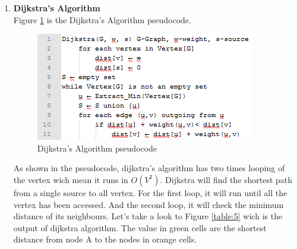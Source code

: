 \begin{enumerate}
	\item \textbf{Dijkstra's Algorithm}\\
	Figure \ref{fig:figure22} is the Dijkstra's Algorithm pseudocode.
	
	\begin{figure}[h!]
		\centering
		\includegraphics[scale=1]{figure6.PNG}
		\caption{Dijkstra's Algorithm pseudocode
		}
		\label{fig:figure22}
	\end{figure}

	As shown in the pseudocode, dijkstra's algorithm has two times looping of the vertex wich mean it runs in \textbf{$O(V^2)$}. Dijkstra will find the shortest path from a single source to all vertex. For the first loop, it will run until all the vertex has been accessed. And the second loop, it will check the minimum distance of its neighbours. Let's take a look to Figure \ref{table:5}
	wich is the output of dijkstra algorithm. The value in green cells are the shortest distance from node A to the nodes in orange cells.
		

\end{enumerate}
